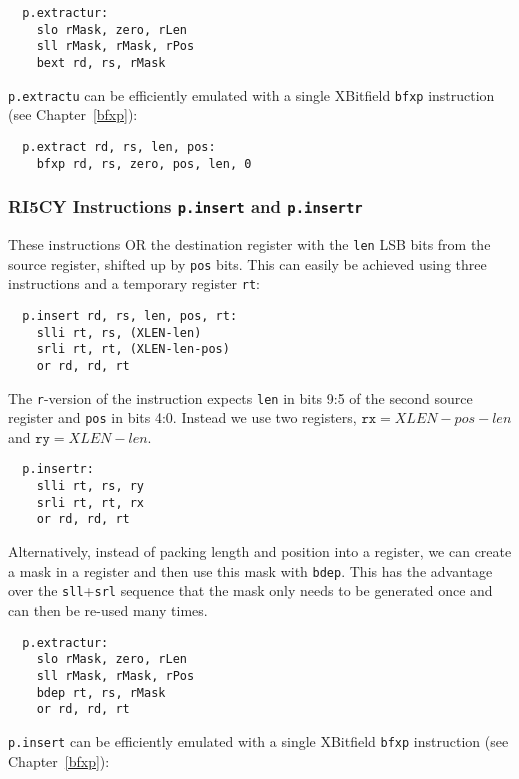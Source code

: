 \begin{verbatim}
  p.extractur:
    slo rMask, zero, rLen
    sll rMask, rMask, rPos
    bext rd, rs, rMask
\end{verbatim}

{\tt p.extractu} can be efficiently emulated with a single XBitfield {\tt bfxp}
instruction (see Chapter~\ref{bfxp}):

\begin{verbatim}
  p.extract rd, rs, len, pos:
    bfxp rd, rs, zero, pos, len, 0
\end{verbatim}

\subsubsection{RI5CY Instructions {\tt p.insert} and {\tt p.insertr}}

These instructions OR the destination register with the {\tt len} LSB bits
from the source register, shifted up by {\tt pos} bits. This can easily
be achieved using three instructions and a temporary register {\tt rt}:

\begin{verbatim}
  p.insert rd, rs, len, pos, rt:
    slli rt, rs, (XLEN-len)
    srli rt, rt, (XLEN-len-pos)
    or rd, rd, rt
\end{verbatim}

The {\tt r}-version of the instruction expects {\tt len} in bits 9:5 of the
second source register and {\tt pos} in bits 4:0. Instead we use two registers,
$\texttt{rx} = XLEN-pos-len$ and $\texttt{ry} = XLEN-len$.

\begin{verbatim}
  p.insertr:
    slli rt, rs, ry
    srli rt, rt, rx
    or rd, rd, rt
\end{verbatim}

Alternatively, instead of packing length and position into a register, we
can create a mask in a register and then use this mask with {\tt bdep}. This
has the advantage over the {\tt sll}+{\tt srl} sequence that the mask only needs
to be generated once and can then be re-used many times.

\begin{verbatim}
  p.extractur:
    slo rMask, zero, rLen
    sll rMask, rMask, rPos
    bdep rt, rs, rMask
    or rd, rd, rt
\end{verbatim}

{\tt p.insert} can be efficiently emulated with a single XBitfield {\tt bfxp}
instruction (see Chapter~\ref{bfxp}):

